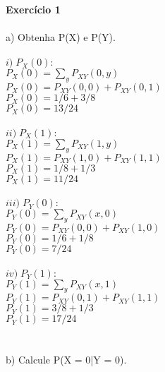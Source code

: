 \documentclass[a4paper]{article}
\begin{document}
\textbf{Exercício 1}
\\
\\
a) Obtenha P(X) e P(Y).                          \\
\\
$ i) \; P_X(0):                                 $\\
$ \displaystyle P_X(0) = \sum_{y} P_{XY}(0,y)   $\\
$ P_X(0) = P_{XY}(0,0) + P_{XY}(0,1)            $\\
$ P_X(0) = 1/6 + 3/8                            $\\
$ \boxed{ P_X(0) = 13/24 }                      $\\
\\
$ ii) \; P_X(1):                                $\\
$ \displaystyle P_X(1) = \sum_{y} P_{XY}(1,y)   $\\
$ P_X(1) = P_{XY}(1,0) + P_{XY}(1,1)            $\\
$ P_X(1) = 1/8 + 1/3                            $\\
$ \boxed{ P_X(1) = 11/24 }                      $\\
\\
$ iii) \; P_Y(0):                               $\\
$ \displaystyle P_Y(0) = \sum_{y} P_{XY}(x,0)   $\\
$ P_Y(0) = P_{XY}(0,0) + P_{XY}(1,0)            $\\
$ P_Y(0) = 1/6 + 1/8                            $\\
$ \boxed{ P_Y(0) = 7/24 }                       $\\
\\
$ iv) \; P_Y(1):                                $\\
$ \displaystyle P_Y(1) = \sum_{y} P_{XY}(x,1)   $\\
$ P_Y(1) = P_{XY}(0,1) + P_{XY}(1,1)            $\\
$ P_Y(1) = 3/8 + 1/3                            $\\
$ \boxed{ P_Y(1) = 17/24 }                      $\\
\\
\\
b) Calcule P(X = 0|Y = 0).                                   \\
\end{document}
